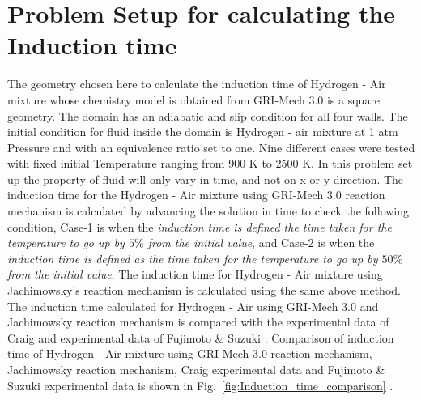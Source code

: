 \documentclass{warpdoc}
\begin{document}
\section{Problem Setup for calculating the Induction time}
The geometry chosen here to calculate the induction time of Hydrogen - Air mixture whose chemistry model is obtained from GRI-Mech 3.0 \cite{GRImech} is a square geometry. The domain has an adiabatic and slip condition for all four walls. The initial condition for fluid inside the domain is Hydrogen - air mixture at 1 atm Pressure and with an equivalence ratio set to one. Nine different cases were tested with fixed initial Temperature ranging from 900 K to 2500 K. In this problem set up the property of fluid will only vary in time, and not on x or y direction. The induction time for the Hydrogen - Air mixture using GRI-Mech 3.0 reaction mechanism is calculated by advancing the solution in time to check the following condition, Case-1 is when the \textit{induction time is defined the time taken for the temperature to go up by $5\%$ from the initial value}, and Case-2 is when the \textit{induction time is defined as the time taken for the temperature to go up by $50\%$ from the initial value}. The induction time for Hydrogen - Air mixture using Jachimowsky's reaction mechanism \cite{nasa:1988:jachimowski} is calculated using the same above method. The induction time calculated for Hydrogen - Air using GRI-Mech 3.0 and Jachimowsky reaction mechanism is compared with the experimental data of Craig \cite{AFAPL:1966:craig} and experimental data of Fujimoto \& Suzuki \cite{fujimoto1967memoirs}. Comparison of induction time of Hydrogen - Air mixture using GRI-Mech 3.0 reaction mechanism, Jachimowsky reaction mechanism, Craig experimental data and Fujimoto \& Suzuki experimental data is shown in Fig.\ \ref{fig:Induction_time_comparison} .
\end{document}
